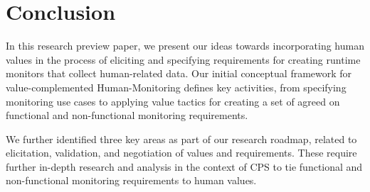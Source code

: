 \section{Conclusion}
\label{sec:conclusion}
In this research preview paper,  we present our  ideas  towards incorporating human values in the process of  eliciting and specifying requirements for  creating runtime monitors that collect human-related data.
Our initial conceptual framework for value-complemented Human-Monitoring defines key activities, from specifying monitoring use cases to applying value tactics for creating a set of agreed on functional and non-functional monitoring requirements. 

We further identified three key areas as part of our research roadmap, related to elicitation, validation, and negotiation of values and requirements. These require further in-depth research and analysis in the context of CPS to tie functional and non-functional monitoring requirements to human values.

